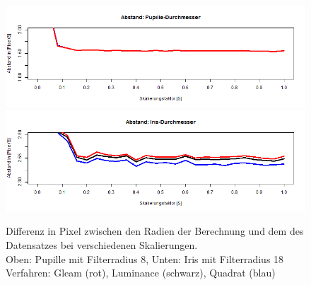 \begin{figure}
	\centering
	\includegraphics[width=\linewidth]{Eye_Img_Box/Vergleich_Scal_P}
	\includegraphics[width=\linewidth]{Eye_Img_Box/Vergleich_Scal_I}
	\caption{Differenz in Pixel zwischen den Radien der Berechnung und dem des Datensatzes  bei verschiedenen Skalierungen.\\ Oben: Pupille mit Filterradius 8, Unten: Iris mit Filterradius 18\\
		Verfahren: Gleam (rot), Luminance (schwarz), Quadrat (blau)}
	\label{img_Vergleich_Scal_PI}
\end{figure}
